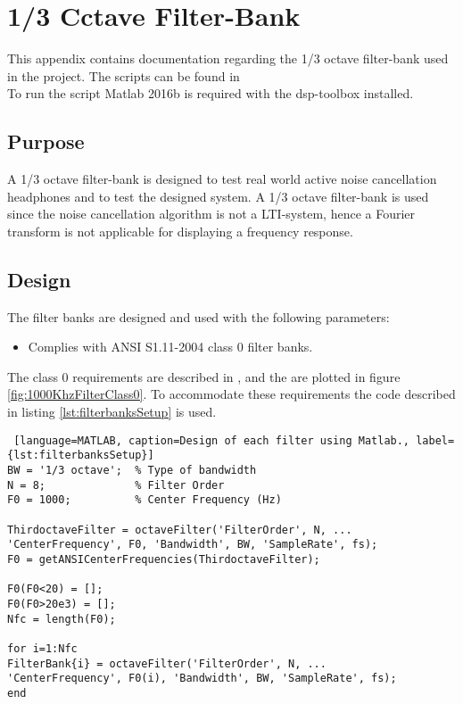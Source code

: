 \section{1/3 Cctave Filter-Bank} {\label{sec:OctaveBank}}


This appendix contains documentation regarding the 1/3 octave filter-bank used in the project. The scripts can be found in 
\\
To run the script Matlab 2016b is required with the dsp-toolbox installed. 

\subsection{Purpose}

A 1/3 octave filter-bank is designed to test real world active noise cancellation headphones and to test the designed system. A 1/3 octave filter-bank is used since the noise cancellation algorithm is not a LTI-system, hence a Fourier transform is not applicable for displaying a frequency response.

\subsection{Design}

The filter banks are designed and used with the following parameters:
\begin{itemize}
	\item Complies with ANSI S1.11-2004 class 0 filter banks.
\end{itemize}
The class 0 requirements are described in \cite{OctaveBand}, and the are plotted in figure \ref{fig:1000KhzFilterClass0}. To accommodate these requirements the code described in listing \ref{lst:filterbanksSetup} is used.

\begin{lstlisting} [language=MATLAB, caption=Design of each filter using Matlab., label={lst:filterbanksSetup}]
BW = '1/3 octave';	% Type of bandwidth
N = 8;           	% Filter Order
F0 = 1000;       	% Center Frequency (Hz)

ThirdoctaveFilter = octaveFilter('FilterOrder', N, ...
'CenterFrequency', F0, 'Bandwidth', BW, 'SampleRate', fs);
F0 = getANSICenterFrequencies(ThirdoctaveFilter);

F0(F0<20) = [];
F0(F0>20e3) = [];
Nfc = length(F0);

for i=1:Nfc
FilterBank{i} = octaveFilter('FilterOrder', N, ...
'CenterFrequency', F0(i), 'Bandwidth', BW, 'SampleRate', fs); 
end
\end{lstlisting}

